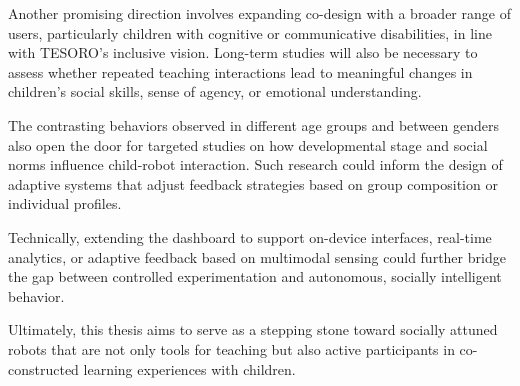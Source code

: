 \documentclass[a4paper]{usiinfbachelorproject}
\begin{document}
Another promising direction involves expanding co-design with a broader range of users, particularly children with cognitive or communicative disabilities, in line with TESORO's inclusive vision.
Long-term studies will also be necessary to assess whether repeated teaching interactions lead to meaningful changes in children's social skills, sense of agency, or emotional understanding.

The contrasting behaviors observed in different age groups and between genders also open the door for targeted studies on how developmental stage and social norms influence child-robot interaction.
Such research could inform the design of adaptive systems that adjust feedback strategies based on group composition or individual profiles.

Technically, extending the dashboard to support on-device interfaces, real-time analytics, or adaptive feedback based on multimodal sensing could further bridge the gap between controlled experimentation and autonomous, socially intelligent behavior.

Ultimately, this thesis aims to serve as a stepping stone toward socially attuned robots that are not only tools for teaching but also active participants in co-constructed learning experiences with children.

\newpage



\end{document}
